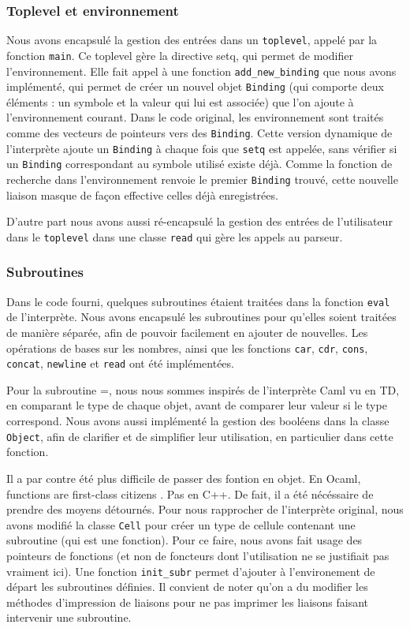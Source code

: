 \documentclass[a4paper,11pt]{article}
\begin{document}
\subsubsection{Toplevel et environnement}

  Nous avons encapsulé la gestion des entrées dans un \texttt{toplevel}, 
 appelé par la fonction \texttt{main}. Ce toplevel gère la directive setq, qui
 permet de modifier l'environnement. 
 Elle fait appel à une fonction \texttt{add\_new\_binding} que nous avons
 implémenté, qui permet de créer un nouvel objet
  \texttt{Binding} (qui comporte deux éléments : un
 symbole et la valeur qui lui est associée) que l'on ajoute à l'environnement courant. 
 Dans le code original, les environnement sont traités comme des vecteurs de pointeurs 
 vers des
 \texttt{Binding}.  Cette version dynamique de l'interprète ajoute un \texttt{Binding} 
 à chaque fois que \texttt{setq} est appelée, sans vérifier si un \texttt{Binding} 
 correspondant au symbole utilisé existe déjà. Comme la fonction de recherche dans 
 l'environnement renvoie le premier \texttt{Binding} trouvé, cette nouvelle liaison
 masque de façon effective celles déjà enregistrées.
 
 D'autre part nous avons aussi ré-encapsulé la gestion des entrées de l'utilisateur 
 dans le \texttt{toplevel} dans une classe \texttt{read} qui gère les appels au parseur.
 
 \subsubsection{Subroutines}
 
  Dans le code fourni, quelques subroutines étaient traitées dans la fonction 
  \texttt{eval} de l'interprète. Nous avons encapsulé les subroutines pour qu'elles soient 
  traitées de manière séparée, afin de pouvoir facilement en ajouter de nouvelles. 
  Les opérations de bases sur les nombres, ainsi que les fonctions \texttt{car}, 
  \texttt{cdr}, \texttt{cons}, \texttt{concat}, \texttt{newline} et \texttt{read} 
  ont été implémentées.
  
  Pour la subroutine =, nous nous sommes inspirés de l’interprète Caml vu en TD, en 
  comparant le type de chaque objet, avant de comparer leur valeur si le type 
  correspond. Nous avons aussi implémenté la gestion des booléens dans la classe 
  \texttt{Object}, afin de clarifier et de simplifier leur utilisation, en 
  particulier dans cette fonction.

  Il a par contre été plus difficile de passer des fontion en objet. En Ocaml,
  \og functions are first-class citizens \og. Pas en C++. De fait, il a été
  nécéssaire de prendre des moyens détournés.
  Pour nous rapprocher de l'interprète original, nous avons modifié la classe
  \texttt{Cell} pour créer un type de cellule contenant une subroutine (qui est
  une fonction). Pour ce faire, nous avons fait usage des pointeurs de fonctions
  (et non de foncteurs dont l'utilisation ne se justifiait pas vraiment ici).
  Une fonction \texttt{init\_subr} permet d'ajouter à l'environement de départ
  les subroutines définies. Il convient de noter qu'on a du modifier les
  méthodes d'impression de liaisons pour ne pas imprimer les liaisons faisant
  intervenir une subroutine.
  
\end{document}
